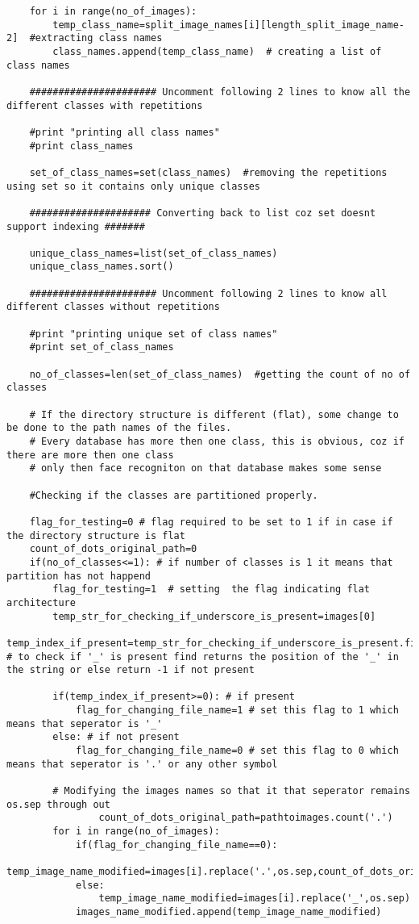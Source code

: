 \documentclass[10pt,a4paper]{article}
\begin{document}
\begin{lstlisting}
	for i in range(no_of_images):
		temp_class_name=split_image_names[i][length_split_image_name-2]  #extracting class names
		class_names.append(temp_class_name)  # creating a list of class names 

	###################### Uncomment following 2 lines to know all the different classes with repetitions
	
	#print "printing all class names"
	#print class_names

	set_of_class_names=set(class_names)  #removing the repetitions using set so it contains only unique classes
	
	##################### Converting back to list coz set doesnt support indexing #######

	unique_class_names=list(set_of_class_names)
	unique_class_names.sort()

	###################### Uncomment following 2 lines to know all different classes without repetitions

	#print "printing unique set of class names"
	#print set_of_class_names

	no_of_classes=len(set_of_class_names)  #getting the count of no of classes

	# If the directory structure is different (flat), some change to be done to the path names of the files. 
	# Every database has more then one class, this is obvious, coz if there are more then one class 
	# only then face recogniton on that database makes some sense

	#Checking if the classes are partitioned properly.
	
	flag_for_testing=0 # flag required to be set to 1 if in case if the directory structure is flat
	count_of_dots_original_path=0
	if(no_of_classes<=1): # if number of classes is 1 it means that partition has not happend 
		flag_for_testing=1  # setting  the flag indicating flat architecture
		temp_str_for_checking_if_underscore_is_present=images[0] 
		temp_index_if_present=temp_str_for_checking_if_underscore_is_present.find('_') # to check if '_' is present find returns the position of the '_' in the string or else return -1 if not present

		if(temp_index_if_present>=0): # if present 
			flag_for_changing_file_name=1 # set this flag to 1 which means that seperator is '_'
		else: # if not present 
			flag_for_changing_file_name=0 # set this flag to 0 which means that seperator is '.' or any other symbol

		# Modifying the images names so that it that seperator remains os.sep through out
                count_of_dots_original_path=pathtoimages.count('.')
		for i in range(no_of_images):
			if(flag_for_changing_file_name==0):
				temp_image_name_modified=images[i].replace('.',os.sep,count_of_dots_original_path+1)
			else:
				temp_image_name_modified=images[i].replace('_',os.sep)
			images_name_modified.append(temp_image_name_modified)


\end{lstlisting}
\end{document}
